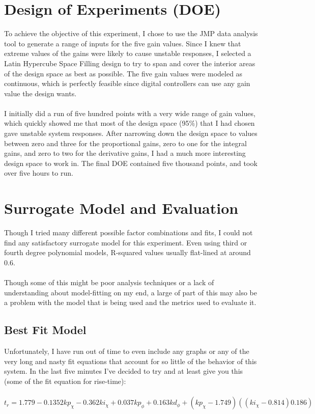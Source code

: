 \documentclass{article}
\begin{document}
\section{Design of Experiments (DOE)}
To achieve the objective of this experiment, I chose to use the JMP data analysis tool to generate a range of inputs for the five gain values. Since I knew that extreme values of the gains were likely to cause unstable responses, I selected a Latin Hypercube Space Filling design to try to span and cover the interior areas of the design space as best as possible. The five gain values were modeled as continuous, which is perfectly feasible since digital controllers can use any gain value the design wants.
\\\\I initially did a run of five hundred points with a very wide range of gain values, which quickly showed me that most of the design space (95\%) that I had chosen gave unstable system responses. After narrowing down the design space to values between zero and three for the proportional gains, zero to one for the integral gains, and zero to two for the derivative gains, I had a much more interesting design space to work in. The final DOE contained five thousand points, and took over five hours to run.

\section{Surrogate Model and Evaluation}
Though I tried many different possible factor combinations and fits, I could not find any satisfactory surrogate model for this experiment. Even using third or fourth degree polynomial models, R-squared values usually flat-lined at around 0.6.
\\\\Though some of this might be poor analysis techniques or a lack of understanding about model-fitting on my end, a large of part of this may also be a problem with the model that is being used and the metrics used to evaluate it.

\subsection{Best Fit Model}
Unfortunately, I have run out of time to even include any graphs or any of the very long and nasty fit equations that account for so little of the behavior of this system. In the last five minutes I've decided to try and at least give you this (some of the fit equation for rise-time):
\\\\
$t_r = 1.779 - 0.1352 kp_{\chi} - 0.362 ki_{\chi} + 0.037 kp_{\phi} + 0.163 kd_{\phi} + (kp_{\chi} - 1.749) ((ki_{\chi} - 0.814) 0.186) $
\end{document}

